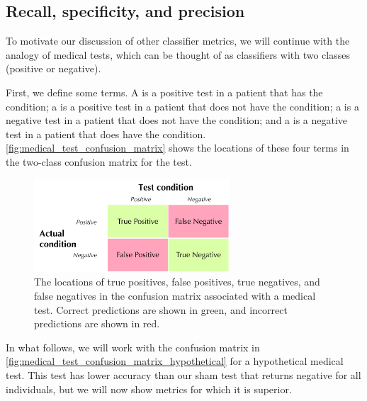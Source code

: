 \begin{qbox}\end{qbox}

\FloatBarrier
{}
\subsection{Recall, specificity, and precision}

To motivate our discussion of other classifier metrics, we will continue with the analogy of medical tests, which can be thought of as classifiers with two classes (positive or negative).

First, we define some terms. A  is a positive test in a patient that has the condition; a  is a positive test in a patient that does not have the condition; a  is a negative test in a patient that does not have the condition; and a  is a negative test in a patient that does have the condition. \autoref{fig:medical_test_confusion_matrix} shows the locations of these four terms in the two-class confusion matrix for the test.

\begin{figure}[h]
\centering
\mySfFamily
\includegraphics[width = 0.65\textwidth]{../images_CMYK/medical_test_confusion_matrix}
\caption{The locations of true positives, false positives, true negatives, and false negatives in the confusion matrix associated with a medical test. Correct predictions are shown in green, and incorrect predictions are shown in red.}
\label{fig:medical_test_confusion_matrix}
\end{figure}

In what follows, we will work with the confusion matrix in \autoref{fig:medical_test_confusion_matrix_hypothetical} for a hypothetical medical test. This test has lower accuracy than our sham test that returns negative for all individuals, but we will now show metrics for which it is superior.\\

